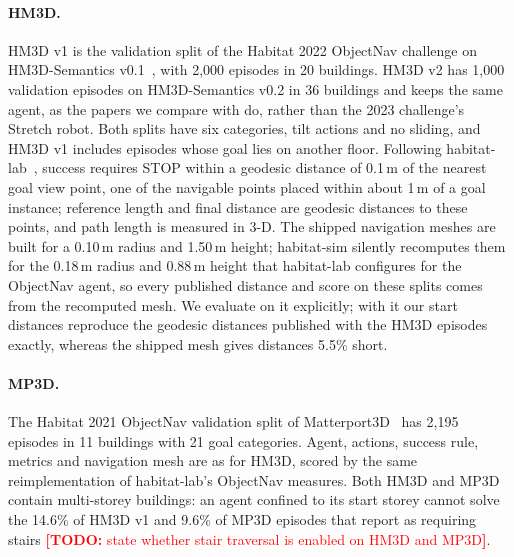 \documentclass[10pt]{article}
\newcommand{\TODO}[1]{\textcolor{red}{\textbf{[TODO:} #1\textbf{]}}}
\begin{document}
\paragraph{HM3D.} HM3D v1 is the validation split of the Habitat 2022 ObjectNav challenge on HM3D-Semantics
v0.1~\citep{ramakrishnan2021habitat,yadav2023habitat}, with 2,000 episodes in 20 buildings. HM3D v2 has 1,000
validation episodes on HM3D-Semantics v0.2 in 36 buildings and keeps the same agent, as the papers we compare with do,
rather than the 2023 challenge's Stretch robot. Both splits have six categories, tilt actions and no sliding, and
HM3D v1 includes episodes whose goal lies on another floor. Following habitat-lab~\citep{szot2021habitat}, success
requires STOP within a geodesic distance of 0.1\,m of the nearest goal view point, one of the navigable points placed
within about 1\,m of a goal instance; reference length and final distance are geodesic distances to these points,
and path length is measured in 3-D. The shipped navigation meshes are built for a 0.10\,m radius and 1.50\,m height;
habitat-sim silently recomputes them for the 0.18\,m radius and 0.88\,m height that habitat-lab configures for the
ObjectNav agent, so every published distance and score on these splits comes from the recomputed mesh. We evaluate
on it explicitly; with it our start distances reproduce the geodesic distances published with the HM3D episodes
exactly, whereas the shipped mesh gives distances 5.5\% short.

\paragraph{MP3D.} The Habitat 2021 ObjectNav validation split of Matterport3D~\citep{chang2017matterport3d} has 2,195
episodes in 11 buildings with 21 goal categories. Agent, actions, success rule, metrics and navigation mesh are as for
HM3D, scored by the same reimplementation of habitat-lab's ObjectNav measures. Both HM3D and MP3D contain multi-storey
buildings: an agent confined to its start storey cannot solve the 14.6\% of HM3D v1 and 9.6\% of MP3D episodes that
\citet{yokoyama2024vlfm} report as requiring stairs \TODO{state whether stair traversal is enabled on HM3D and MP3D}.
\end{document}
